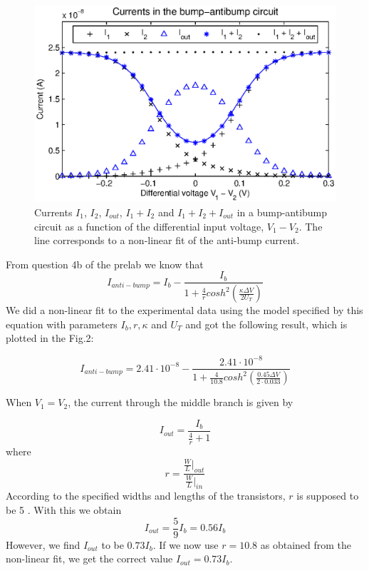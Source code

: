 \begin{figure}[!htb]
	\center
	\includegraphics{q2.eps}
	\caption{Currents \(I_1\), \(I_2\), \(I_{out}\), \(I_1+I_2\) and \(I_1+I_2+I_{out}\) in a bump-antibump circuit as a function of the differential input voltage, \(V_1-V_2\). The line corresponds to a non-linear fit of the anti-bump current.}
	\label{fig:ex2}
\end{figure}

From question 4b of the prelab we know that 
\begin{equation*}
I_{anti-bump} = I_b-\frac{I_b}{1+\frac{4}{r}cosh^2(\frac{\kappa \Delta V}{2U_T})}
\end{equation*}
We did a non-linear fit to the experimental data using the model specified by this equation with parameters \(I_b, r, \kappa\) and \(U_T\) and got the following result, which is plotted in the Fig.2:

\begin{equation*}
I_{anti-bump} = 2.41\cdot10^{-8}-\frac{2.41\cdot10^{-8}}{1+\frac{4}{10.8}cosh^2(\frac{0.45 \Delta V}{2\cdot0.033})}
\end{equation*}

When \(V_1=V_2\), the current through the middle branch is given by

\begin{equation*}
I_{out} = \frac{I_b}{\frac{4}{r}+1}
\end{equation*}
where 
\begin{equation*}
r = \frac{\frac{W}{L}\big|_{out}}{\frac{W}{L}\big|_{in}} 
\end{equation*}
According to the specified widths and lengths of the transistors, \(r\) is supposed to be 5 . With this we obtain
\begin{equation*}
I_{out} = \frac{5}{9}I_b=0.56I_b
\end{equation*}
However, we find \(I_{out}\) to be \(0.73I_b\).
If we now use \(r=10.8\) as obtained from the non-linear fit, we get the correct value \(I_{out}=0.73I_b\). 

